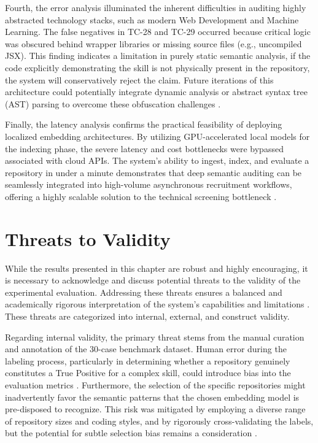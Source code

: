 Fourth, the error analysis illuminated the inherent difficulties in auditing highly abstracted technology stacks, such as modern Web Development and Machine Learning. The false negatives in TC-28 and TC-29 occurred because critical logic was obscured behind wrapper libraries or missing source files (e.g., uncompiled JSX). This finding indicates a limitation in purely static semantic analysis, if the code explicitly demonstrating the skill is not physically present in the repository, the system will conservatively reject the claim. Future iterations of this architecture could potentially integrate dynamic analysis or abstract syntax tree (AST) parsing to overcome these obfuscation challenges \cite{ref54, ref59}.

Finally, the latency analysis confirms the practical feasibility of deploying localized embedding architectures. By utilizing GPU-accelerated local models for the indexing phase, the severe latency and cost bottlenecks were bypassed associated with cloud APIs. The system's ability to ingest, index, and evaluate a repository in under a minute demonstrates that deep semantic auditing can be seamlessly integrated into high-volume asynchronous recruitment workflows, offering a highly scalable solution to the technical screening bottleneck \cite{ref36, ref29}.

\section{Threats to Validity}

While the results presented in this chapter are robust and highly encouraging, it is necessary to acknowledge and discuss potential threats to the validity of the experimental evaluation. Addressing these threats ensures a balanced and academically rigorous interpretation of the system's capabilities and limitations \cite{ref35, ref17}. These threats are categorized into internal, external, and construct validity.

Regarding internal validity, the primary threat stems from the manual curation and annotation of the 30-case benchmark dataset. Human error during the labeling process, particularly in determining whether a repository genuinely constitutes a True Positive for a complex skill, could introduce bias into the evaluation metrics \cite{ref10, ref60}. Furthermore, the selection of the specific repositories might inadvertently favor the semantic patterns that the chosen embedding model is pre-disposed to recognize. This risk was mitigated by employing a diverse range of repository sizes and coding styles, and by rigorously cross-validating the labels, but the potential for subtle selection bias remains a consideration \cite{ref72}.

